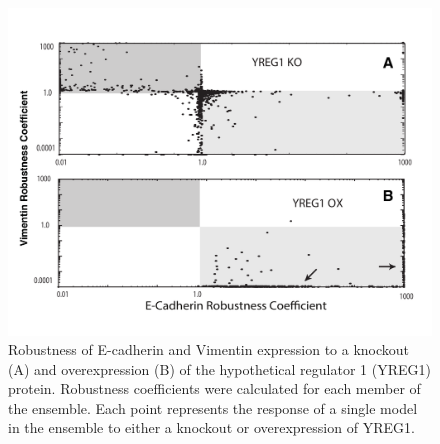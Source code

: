 \documentclass[12pt]{article}
\begin{document}
\begin{figure}
\includegraphics [width=1.0\linewidth] {./figs/Fig-8-Supplemental-YREG1.pdf}
\caption{Robustness of E-cadherin and Vimentin expression to a knockout (A) and overexpression (B) of the hypothetical regulator 1 (YREG1) protein.
Robustness coefficients were calculated for each member of the ensemble. Each point represents the response of a single model in the ensemble to either a knockout or
overexpression of YREG1.}\label{fig:S8}
\end{figure}
\end{document}
